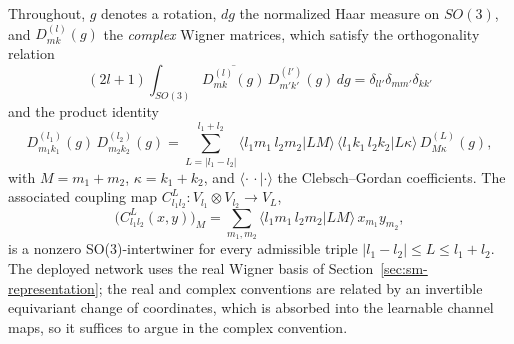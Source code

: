 Throughout, $g$ denotes a rotation, $dg$ the normalized Haar measure on $SO(3)$, and $D^{(l)}_{mk}(g)$ the \emph{complex} Wigner matrices, which satisfy the orthogonality relation
\begin{equation}
    (2l+1)\int_{SO(3)}\overline{D^{(l)}_{mk}(g)}\,D^{(l')}_{m'k'}(g)\,dg
    =\delta_{ll'}\delta_{mm'}\delta_{kk'}
    \label{eq:sm-wigner-orth}
\end{equation}
and the product identity~\cite{varshalovich1988quantum}
\begin{equation}
    D^{(l_1)}_{m_1k_1}(g)\,D^{(l_2)}_{m_2k_2}(g) =\sum_{L=|l_1-l_2|}^{l_1+l_2} \langle l_1 m_1\, l_2 m_2|L M\rangle\, \langle l_1 k_1\, l_2 k_2|L \kappa\rangle\, D^{(L)}_{M\kappa}(g), \label{eq:sm-wigner-product} \end{equation} with $M=m_1+m_2$, $\kappa=k_1+k_2$, and $\langle\cdot\,\cdot|\cdot\rangle$ the Clebsch--Gordan coefficients.
The associated coupling map $C^{L}_{l_1l_2}:V_{l_1}\otimes V_{l_2}\to V_L$,
\begin{equation}
    \bigl(C^{L}_{l_1l_2}(x,y)\bigr)_M
    =\sum_{m_1,m_2}\langle l_1 m_1\, l_2 m_2|L M\rangle\,x_{m_1}y_{m_2},
    \label{eq:sm-cg-map}
\end{equation}
is a nonzero SO(3)-intertwiner for every admissible triple $|l_1-l_2|\le L\le l_1+l_2$.
The deployed network uses the real Wigner basis of Section~\ref{sec:sm-representation}; the real and complex conventions are related by an invertible equivariant change of coordinates, which is absorbed into the learnable channel maps, so it suffices to argue in the complex convention.

